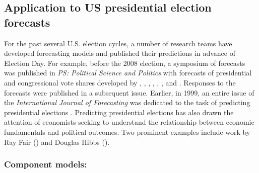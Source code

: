 \documentclass[12pt,fullpage,endnotes]{article}
\begin{document}
\subsection{Application to US presidential election forecasts}
For the past several U.S. election cycles, a number of research teams
have developed forecasting models and published their predictions in
advance of Election Day.  For example, before the 2008 election, a
symposium of forecasts was published in \emph{PS: Political Science
  and Politics} with forecasts of presidential and congressional vote
shares developed by \citet{Campbell:2008}, \citet{Norpoth:2008},
\citet{Lewis-Beck:Tien:2008}, \citet{Abramowitz:2008},
\citet{Erikson:Wlezien:2008}, \citet{Holbrook:2008},
\citet{Lockerbie:2008} and \citet{Cuzan:Bundrick:2008}.  Responses to
the forecasts were published in a subsequent issue. Earlier, in 1999,
an entire issue of the \textit{International Journal of Forecasting}
was dedicated to the task of predicting presidential elections
\citep{Brown:1999}.  Predicting presidential elections has also drawn
the attention of economists seeking to understand the relationship
between economic fundamentals and political outcomes.  Two prominent
examples include work by Ray Fair (\citeyear{Fair:2010}) and Douglas
Hibbs (\citeyear{Hibbs:2000}).

\subsubsection{Component models:}
\end{document}
